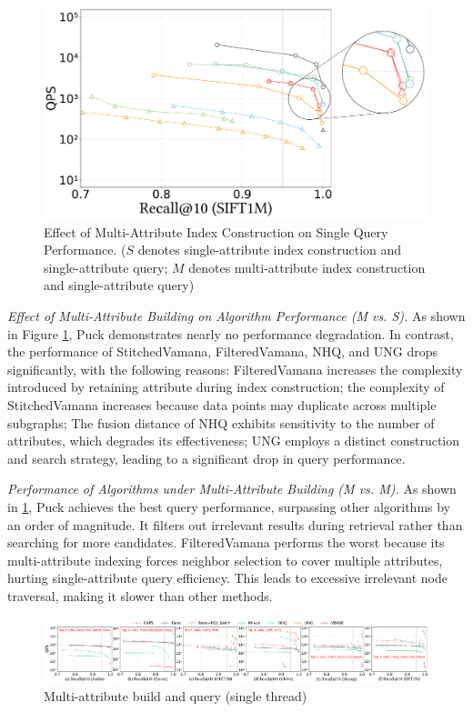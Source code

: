 \documentclass[sigconf, nonacm]{acmart}
\begin{document}
\begin{sloppypar}
\begin{figure}[th]
    \includegraphics[width=0.8\columnwidth]{figures/exp/exp_2_1.pdf}
    \caption{Effect of Multi-Attribute Index Construction on Single Query Performance. ($S$ denotes single-attribute index construction and single-attribute query; $M$ denotes multi-attribute index construction and single-attribute query)}
    \label{fig:exp_2_1}
    
\end{figure}

\textit{Effect of Multi-Attribute Building on Algorithm Performance (M vs. S).}
As shown in Figure \ref{fig:exp_2_1}, Puck demonstrates nearly no performance degradation. In contrast, the performance of StitchedVamana, FilteredVamana, NHQ, and UNG drops significantly, with the following reasons: FilteredVamana increases the complexity introduced by retaining attribute during index construction; the complexity of StitchedVamana increases because data points may duplicate across multiple subgraphs; The fusion distance of NHQ exhibits sensitivity to the number of attributes, which degrades its effectiveness; UNG employs a distinct construction and search strategy, leading to a significant drop in query performance.



\textit{Performance of Algorithms under Multi-Attribute Building (M vs. M).}  
As shown in \ref{fig:exp_2_1}, Puck achieves the best query performance, surpassing other algorithms by an order of magnitude. It filters out irrelevant results during retrieval rather than searching for more candidates. FilteredVamana performs the worst because its multi-attribute indexing forces neighbor selection to cover multiple attributes, hurting single-attribute query efficiency. This leads to excessive irrelevant node traversal, making it slower than other methods.


\begin{figure}
        \centering
        \setlength{\abovecaptionskip}{0cm}
        \setlength{\belowcaptionskip}{-0.4cm}
        \includegraphics[width=\textwidth]{figures/exp/exp_4_1_MultiLabel_1thread.pdf}
        \caption{Multi-attribute build and query (single thread)}
        \label{fig:exp_4_1_MultiLabel_1thread}
\end{figure}


\end{sloppypar}
\end{document}
